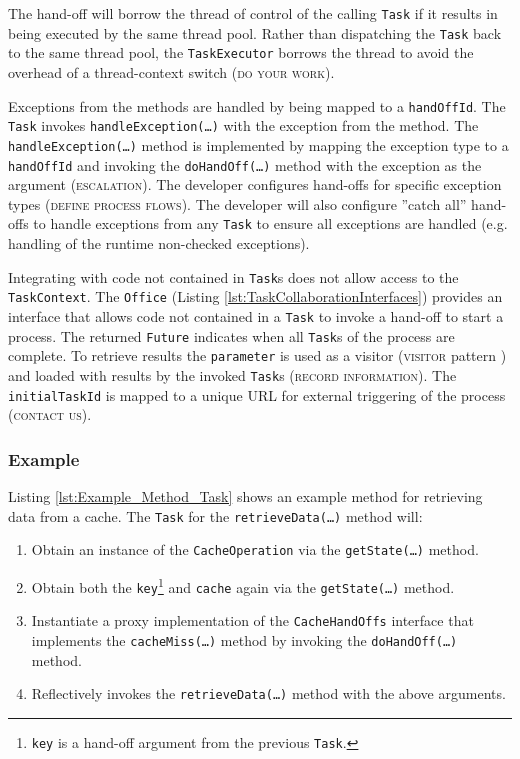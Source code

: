 \documentclass[prodmode]{style/acmlarge}
\begin{document}
The hand-off will borrow the thread of control of the calling \texttt{Task} if
it results in being executed by the same thread pool.  Rather than dispatching
the \texttt{Task} back to the same thread pool, the \texttt{TaskExecutor}
borrows the thread to avoid the overhead of a thread-context switch (\textsc{do
your work}).

Exceptions from the methods are handled by being mapped to a \texttt{handOffId}.
The \texttt{Task} invokes \texttt{handle\-Excep\-tion(\ldots)} with the
exception from the method.  The \texttt{handleException(\ldots)} method is
implemented by mapping the exception type to a \texttt{handOffId} and invoking
the \texttt{doHandOff(\ldots)} method with the exception as the argument
(\textsc{escalation}).  The developer configures hand-offs for specific
exception types (\textsc{define process flows}).  The developer will also
configure ''catch all'' hand-offs to handle exceptions from any \texttt{Task} to
ensure all exceptions are handled (e.g. handling of the runtime non-checked
exceptions).

Integrating with code not contained in \texttt{Task}s does not allow access to
the \texttt{TaskContext}.  The \texttt{Office} (Listing
\ref{lst:TaskCollaborationInterfaces}) provides an interface that allows code
not contained in a \texttt{Task} to invoke a hand-off to start a process.  The
returned \texttt{Future} indicates when all \texttt{Task}s of the process are
complete.  To retrieve results the \texttt{parameter} is used as a visitor
(\textsc{visitor} pattern \cite{gof}) and loaded with results by the invoked
\texttt{Task}s (\textsc{record information}).  The \texttt{initialTaskId} is
mapped to a unique URL for external triggering of the process (\textsc{contact
us}).



\subsubsection*{Example}

Listing \ref{lst:Example_Method_Task} shows an example method for retrieving
data from a cache.  The \texttt{Task} for the \texttt{retrieve\-Data(\ldots)} method will:
\begin{enumerate}
  \item Obtain an instance of the \texttt{CacheOperation} via the \texttt{getState(\ldots)} method.
  \item Obtain both the \texttt{key}\footnote{\texttt{key} is a hand-off argument from the previous \texttt{Task}.} and \texttt{cache} again via the \texttt{getState(\ldots)} method.
  \item Instantiate a proxy implementation of the \texttt{CacheHandOffs} interface that implements the \texttt{cacheMiss(\ldots)} method by invoking the \texttt{doHandOff(\ldots)} method. 
  \item Reflectively invokes the \texttt{retrieveData(\ldots)} method with the above arguments.
\end{enumerate}
\end{document}
